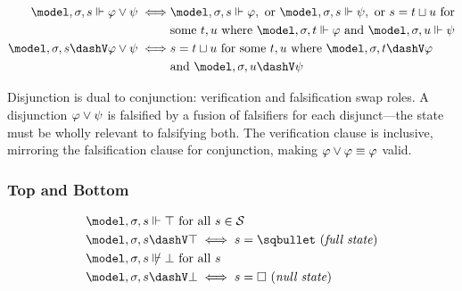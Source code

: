 \documentclass[../LogosReference.tex]{subfiles}
\begin{document}
\begin{definition}\label{def:disjunction-verification}
	\begin{align}
		\model, \assignment, s \verifies \metaA \lor \metaB \iff
		 & \model, \assignment, s \verifies \metaA, \text{ or } \model, \assignment, s \verifies \metaB, \text{ or } s = \fusion{t}{u} \text{ for} \notag \\
		 & \text{some } t, u \text{ where } \model, \assignment, t \verifies \metaA \text{ and } \model, \assignment, u \verifies \metaB                  \\
		\model, \assignment, s \falsifies \metaA \lor \metaB \iff
		 & s = \fusion{t}{u} \text{ for some } t, u \text{ where } \model, \assignment, t \falsifies \metaA \notag                                        \\
		 & \text{and } \model, \assignment, u \falsifies \metaB
	\end{align}
\end{definition}

\begin{remark}
Disjunction is dual to conjunction: verification and falsification swap roles.
A disjunction $\varphi \lor \psi$ is falsified by a fusion of falsifiers for each disjunct---the state must be wholly relevant to falsifying both.
The verification clause is inclusive, mirroring the falsification clause for conjunction, making $\varphi \lor \varphi \equiv \varphi$ valid.
\end{remark}

\subsubsection{Top and Bottom}\label{sec:top-bottom}

\begin{definition}\label{def:top-bottom-verification}
	\begin{align}
		 & \model, \assignment, s \verifies \top \text{ for all } s \in \statespace                 \\
		 & \model, \assignment, s \falsifies \top \iff s = \fullstate \text{ (\textit{full state})} \\
		 & \model, \assignment, s \nverifies \bot \text{ for all } s                                \\
		 & \model, \assignment, s \falsifies \bot \iff s = \nullstate \text{ (\textit{null state})}
	\end{align}
\end{definition}
\end{document}
